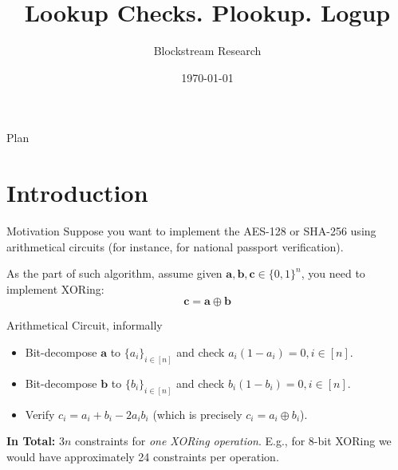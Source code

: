 \documentclass{zkdl-presentation-template}
\title[Lookup Checks]{\textbf{Lookup Checks. Plookup. Logup}}
\author{Blockstream Research}
\date{\today}
\begin{document}
    \maketitleframe

    \begin{frame}{Plan}
      \tableofcontents
    \end{frame}

	\section{Introduction}

    \begin{frame}{Motivation}
        Suppose you want to implement the AES-128 or SHA-256 using arithmetical
        circuits (for instance, for national passport verification).\pause

        As the part of such algorithm, assume given
        $\boldsymbol{a},\boldsymbol{b},\boldsymbol{c} \in \{0,1\}^n$, you need to implement XORing:
        \begin{equation*}
            \boldsymbol{c} = \boldsymbol{a} \oplus \boldsymbol{b}
        \end{equation*}

        \pause\begin{block}{Arithmetical Circuit, informally}
            \begin{itemize}
                \item Bit-decompose $\boldsymbol{a}$ to $\{a_i\}_{i \in [n]}$ and check $a_i(1-a_i)=0, i\in [n]$.\pause
                \item Bit-decompose $\boldsymbol{b}$ to $\{b_i\}_{i \in [n]}$ and check $b_i(1-b_i)=0, i\in [n]$.\pause
                \item Verify $c_i = a_i+b_i-2a_ib_i$ (which is precisely
                $c_i=a_i \oplus b_i$).\pause
            \end{itemize}

            \textbf{In Total:} $3n$ constraints for \textit{one XORing
            operation}. E.g., for 8-bit XORing we would have approximately 24
            constraints per operation.
        \end{block}
    \end{frame}
\end{document}
